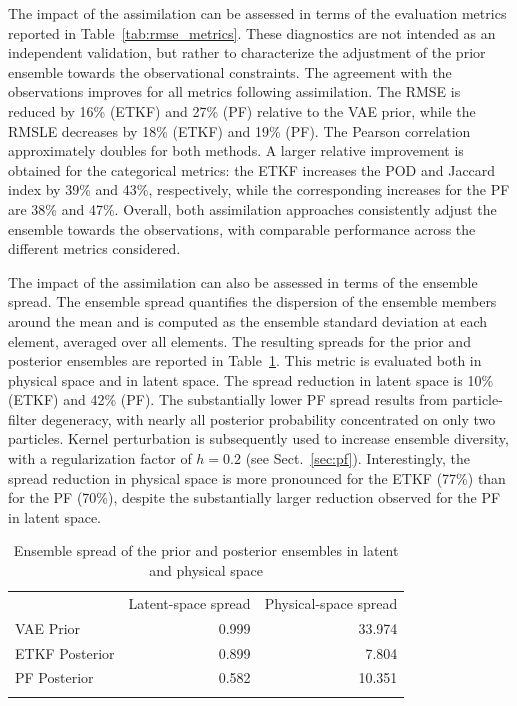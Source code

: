 %
%
The impact of the assimilation can be assessed in terms of the evaluation metrics reported in Table~\ref{tab:rmse_metrics}. These diagnostics are not intended as an independent validation, but rather to characterize the adjustment of the prior ensemble towards the observational constraints. The agreement with the observations improves for all metrics following assimilation. The RMSE is reduced by 16\% (ETKF) and 27\% (PF) relative to the VAE prior, while the RMSLE decreases by 18\% (ETKF) and 19\% (PF). The Pearson correlation approximately doubles for both methods. A larger relative improvement is obtained for the categorical metrics: the ETKF increases the POD and Jaccard index by 39\% and 43\%, respectively, while the corresponding increases for the PF are 38\% and 47\%. Overall, both assimilation approaches consistently adjust the ensemble towards the observations, with comparable performance across the different metrics considered.

%
%
The impact of the assimilation can also be assessed in terms of the ensemble spread. The ensemble spread quantifies the dispersion of the ensemble members around the mean and is computed as the ensemble standard deviation at each element, averaged over all elements. The resulting spreads for the prior and posterior ensembles are reported in Table~\ref{tab:spread_metrics}. This metric is evaluated both in physical space and in latent space.
%
%
The spread reduction in latent space is 10\% (ETKF) and 42\% (PF). The substantially lower PF spread results from particle-filter degeneracy, with nearly all posterior probability concentrated on only two particles. Kernel perturbation is subsequently used to increase ensemble diversity, with a regularization factor of $h=0.2$ (see Sect.~\ref{sec:pf}). Interestingly, the spread reduction in physical space is more pronounced for the ETKF (77\%) than for the PF (70\%), despite the substantially larger reduction observed for the PF in latent space.

\begin{table}[htbp]
    \centering
    \caption{Ensemble spread of the prior and posterior ensembles in latent and physical space}
    \label{tab:spread_metrics}
    \begin{tabular}{lrr}
        \tophline
        ~              & Latent-space spread & Physical-space spread \\ \middlehline
        VAE Prior      & 0.999 & 33.974 \\
        ETKF Posterior & 0.899 & 7.804 \\
        PF Posterior   & 0.582 & 10.351 \\
        \bottomhline
    \end{tabular}
\end{table}

